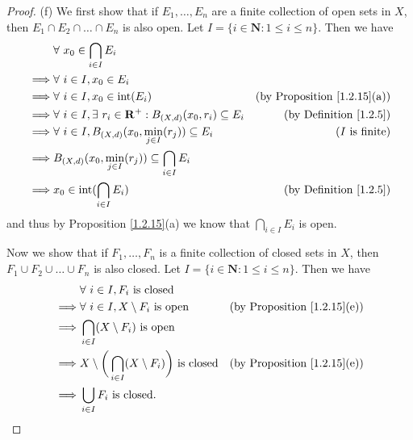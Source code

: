\begin{proof}{(f)}
    We first show that if \(E_1, \dots, E_n\) are a finite collection of open sets in \(X\), then \(E_1 \cap E_2 \cap \dots \cap E_n\) is also open.
    Let \(I = \{i \in \mathbf{N} : 1 \leq i \leq n\}\).
    Then we have
    \begin{align*}
                 & \forall\ x_0 \in \bigcap_{i \in I} E_i                                                                                         \\
        \implies & \forall\ i \in I, x_0 \in E_i                                                                                                  \\
        \implies & \forall\ i \in I, x_0 \in \text{int}(E_i)                                            & \text{(by Proposition \ref{1.2.15}(a))} \\
        \implies & \forall\ i \in I, \exists\ r_i \in \mathbf{R}^+ : B_{(X, d)}(x_0, r_i) \subseteq E_i & \text{(by Definition \ref{1.2.5})}      \\
        \implies & \forall\ i \in I, B_{(X, d)}(x_0, \min_{j \in I}(r_j)) \subseteq E_i                 & \text{(\(I\) is finite)}                \\
        \implies & B_{(X, d)}(x_0, \min_{j \in I}(r_j)) \subseteq \bigcap_{i \in I} E_i                                                           \\
        \implies & x_0 \in \text{int}(\bigcap_{i \in I} E_i)                                            & \text{(by Definition \ref{1.2.5})}
    \end{align*}
    and thus by Proposition \ref{1.2.15}(a) we know that \(\bigcap_{i \in I} E_i\) is open.

    Now we show that if \(F_1, \dots, F_n\) is a finite collection of closed sets in \(X\), then \(F_1 \cup F_2 \cup \dots \cup F_n\) is also closed.
    Let \(I = \{i \in \mathbf{N} : 1 \leq i \leq n\}\).
    Then we have
    \begin{align*}
                 & \forall\ i \in I, F_i \text{ is closed}                                                                                 \\
        \implies & \forall\ i \in I, X \setminus F_i \text{ is open}                             & \text{(by Proposition \ref{1.2.15}(e))} \\
        \implies & \bigcap_{i \in I} (X \setminus F_i) \text{ is open}                                                                     \\
        \implies & X \setminus \bigg(\bigcap_{i \in I} (X \setminus F_i)\bigg) \text{ is closed} & \text{(by Proposition \ref{1.2.15}(e))} \\
        \implies & \bigcup_{i \in I} F_i \text{ is closed}.
    \end{align*}
\end{proof}

